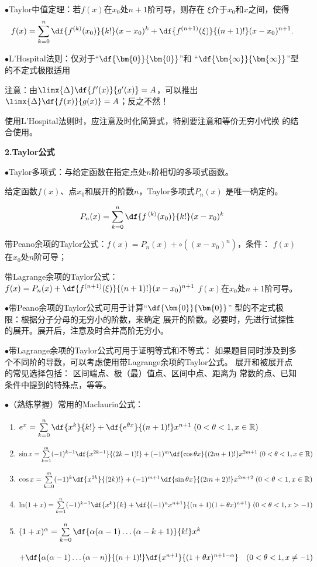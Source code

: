$\bullet$Taylor中值定理：若$f(x)$在$x_0$处$n+1$阶可导，则存在
$\xi$介于$x_0$和$x$之间，使得
$$f(x)=\sum\limits_{k=0}^n\df{f^{(k)}(x_0)}{k!}(x-x_0)^k
+\df{f^{(n+1)}(\xi)}{(n+1)!}(x-x_0)^{n+1}.$$

$\bullet$L'Hospital法则：仅对于“$\df{\bm{0}}{\bm{0}}$”和
“$\df{\bm{\infty}}{\bm{\infty}}$”型的不定式极限适用

注意：由$\limx{\Delta}\df{f'(x)}{g'(x)}=A$，可以推出
$\limx{\Delta}\df{f(x)}{g(x)}=A$；反之不然！

使用L'Hospital法则时，应注意及时化简算式，特别要注意和等价无穷小代换
的结合使用。

{\bf 2.Taylor公式}

$\bullet$Taylor多项式：与给定函数在指定点处$n$阶相切的多项式函数。

给定函数$f(x)$、点$x_0$和展开的阶数$n$，Taylor多项式$P_n(x)$
是唯一确定的。

$$P_n(x)=\sum\limits_{k=0}^n\df{f^{\,(k)}(x_0)}{k!}(x-x_0)^k$$

带Peano余项的Taylor公式：$f(x)=P_n(x)+\circ((x-x_0)^n)$，条件：
$f(x)$在$x_0$处$n$阶可导；

带Lagrange余项的Taylor公式：$f(x)=P_n(x)+\df{f^{(n+1)}(\xi)}{(n+1)!}(x-x_0)^{n+1}$
$f(x)$在$x_0$处$n+1$阶可导。

$\bullet$带Peano余项的Taylor公式可用于计算“$\df{\bm{0}}{\bm{0}}$”
型的不定式极限：根据分子分母的无穷小的阶数，来确定
展开的阶数。必要时，先进行试探性的展开。展开后，注意及时合并高阶无穷小。

$\bullet$带Lagrange余项的Taylor公式可用于证明等式和不等式：
如果题目同时涉及到多个不同阶的导数，可以考虑使用带Lagrange余项的Taylor公式。
展开和被展开点的常见选择包括： 区间端点、极（最）值点、区间中点、距离为
常数的点、已知条件中提到的特殊点，等等。

$\bullet$（熟练掌握）常用的Maclaurin公式：
\begin{enumerate}[(1)]
  \setlength{\itemindent}{1cm}
  \item $e^x =\sum\limits_{k=0}^n\df{x^k}{k!}
  +\df{e^{\theta x}}{(n+1)!}x^{n+1}\;
  (0<\theta<1,x\in\mathbb{R})$
  \item $\sin x
  =\sum\limits_{k=1}^m(-1)^{k-1}\df{x^{2k-1}}{(2k-1)!} 
  +(-1)^m\df{\cos\theta x}{(2m+1)!}x^{2m+1}\;
  (0<\theta<1,x\in\mathbb{R})$
  \item $\cos x= \sum\limits_{k=0}^m(-1)^{k}\df{x^{2k}}{(2k)!}
  +(-1)^{m+1}\df{\sin\theta
  x}{(2m+2)!}x^{2m+2}\; (0<\theta<1,x\in\mathbb{R})$
  \item
  $\ln(1+x) =\sum\limits_{k=1}^n(-1)^{k-1}\df{x^k}{k}
  +\df{(-1)^nx^{n+1}}{(n+1)(1+\theta
  x)^{n+1}}\; (0<\theta<1,x>-1)$
  \item
  $(1+x)^\alpha =\sum\limits_{k=0}^n
  \df{\alpha(\alpha-1)\ldots(\alpha-k+1)}{k!}x^k$

	\hspace{2cm}$+\df{\alpha(\alpha-1)\ldots(\alpha-n)}{(n+1)!}\df{x^{n+1}}{(1+\theta
	x)^{n+1-\alpha}}\quad (0<\theta<1,x\ne -1)$
\end{enumerate}

